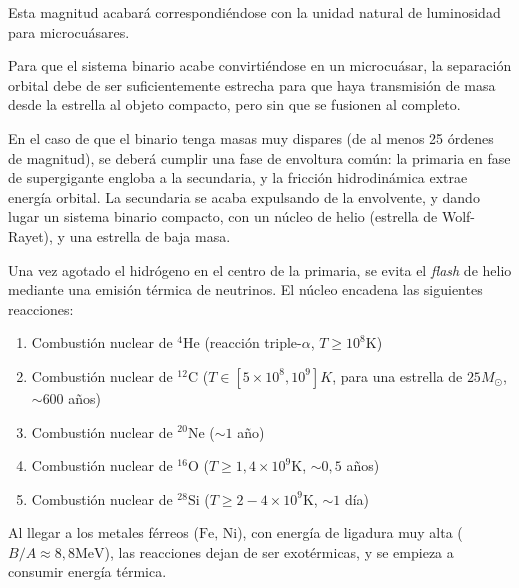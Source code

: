 \noindent Esta magnitud acabará correspondiéndose con la unidad natural de luminosidad para microcuásares. 

Para que el sistema binario acabe convirtiéndose en un microcuásar, la separación orbital debe de ser suficientemente estrecha para que haya transmisión de masa desde la estrella al objeto compacto, pero sin que se fusionen al completo. 

En el caso de que el binario tenga masas muy dispares (de al menos 25 órdenes de magnitud), se deberá cumplir una fase de envoltura común: la primaria en fase de supergigante engloba a la secundaria, y la fricción hidrodinámica extrae energía orbital. La secundaria se acaba expulsando de la envolvente, y dando lugar un sistema binario compacto, con un núcleo de helio (estrella de Wolf-Rayet), y una estrella de baja masa.

Una vez agotado el hidrógeno en el centro de la primaria, se evita el \textit{flash} de helio mediante una emisión térmica de neutrinos. El núcleo encadena las siguientes reacciones:

\vspace{-0.5em}

\begin{enumerate}
  \item Combustión nuclear de $\phantom{}^4\mbox{He}$ (reacción triple-$\alpha$, $T\geq 10^8\mbox{K}$)\vspace{-0.5em}
  \item Combustión nuclear de $\phantom{}^{12}\mbox{C}$ ($T\in[5\times10^8, 10^9]K$, para una estrella de $25M_{\odot}$, $\sim600$ años)\vspace{-0.75em}
  \item Combustión nuclear de $\phantom{}^{20}\mbox{Ne}$ ($\sim 1$ año)\vspace{-0.5em}
  \item Combustión nuclear de $\phantom{}^{16}\mbox{O}$ ($T\geq1,4\times10^9\mbox{K}$, $\sim 0,5$ años)\vspace{-0.5em}
  \item Combustión nuclear de $\phantom{}^{28}\mbox{Si}$ ($T\geq 2-4\times10^{9}\mbox{K}$, $\sim 1$ día)\vspace{-0.5em}
\end{enumerate}

\noindent Al llegar a los metales férreos ($\mbox{Fe, Ni}$), con energía de ligadura muy alta ($B/A\approx8,8\mbox{MeV}$), las reacciones dejan de ser exotérmicas, y se empieza a consumir energía térmica.

